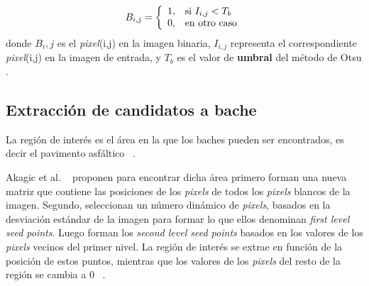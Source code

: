 $$B_{i,j}=\left\{
    \begin{array}{c l}
        1, & \text{si } I_{i,j} < T_{b}\\
        0, & \text{en otro caso}\\
    \end{array}
\right.$$
donde $B_i,j$ es el \emph{pixel}(i,j) en la imagen binaria, $I_{i,j}$ representa el correspondiente \emph{pixel}(i,j) en la imagen de entrada, y
$T_b$ es el valor de \textbf{umbral} del método de Otsu .

\subsection{Extracción de candidatos a bache}
La región de interés es el área en la que los baches pueden ser encontrados, es decir el pavimento asfáltico ~.

Akagic et al. ~ proponen para encontrar dicha área  primero forman una nueva matriz que contiene las posiciones 
de los \emph{pixels} de todos los \emph{pixels} blancos de la imagen. Segundo, seleccionan un número dinámico de \emph{pixels}, basados 
en la desviación estándar de la imagen para formar lo que ellos denominan \emph{first level seed points}. Luego forman  los 
\emph{second level seed points} basados en los valores de los \emph{pixels} vecinos del primer nivel. La región de
interés se extrae en función de la posición de estos puntos, mientras que los valores de los \emph{pixels} del resto de la región se cambia a
0 ~.

